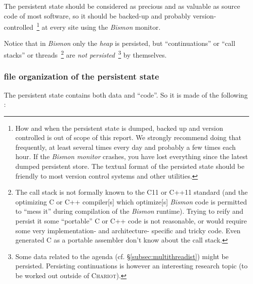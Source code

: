 The persistent state should be considered as precious and as valuable
as source code of most software, so it should be backed-up and
probably version-controlled~\footnote{How and when the persistent
  state is dumped, backed up and version controlled is out of scope of
  this report. We strongly recommend doing that frequently, at least
  several times every day and probably a few times each hour. If the
  \textit{Bismon monitor} crashes, you have lost everything since the
  latest dumped persistent store. The textual format of the persisted
  state should be friendly to most version control systems and other
  utilities.} at every site using the \emph{Bismon} monitor.

Notice that in \emph{Bismon} only the \emph{heap} is persisted, but
``continuations'' or ``call stacks'' or threads~\footnote{The call
  stack is not formally known to the C11 or C++11 standard (and the
  optimizing C or C++ compiler[s] which optimize[s] \emph{Bismon} code
  is permitted to ``mess it'' during compilation of the \emph{Bismon}
  runtime). Trying to reify and persist it some ``portable'' C or C++
  code is not reasonable, or would require some very implementation-
  and architecture- specific and tricky code. Even generated C as a
  portable assembler don't know about the call stack.}  are \emph{not
  persisted}~\footnote{Some data related to the agenda
  (cf. \S\ref{subsec:multithreadist}) might be persisted. Persisting
  continuations is however an interesting research topic (to be
  worked out outside of \textsc{Chariot}).} by themselves.

\subsubsection{file organization of the persistent state}
\label{subsubsec:filestate}

The persistent state contains both data and ``code''. So it is made of the following :


